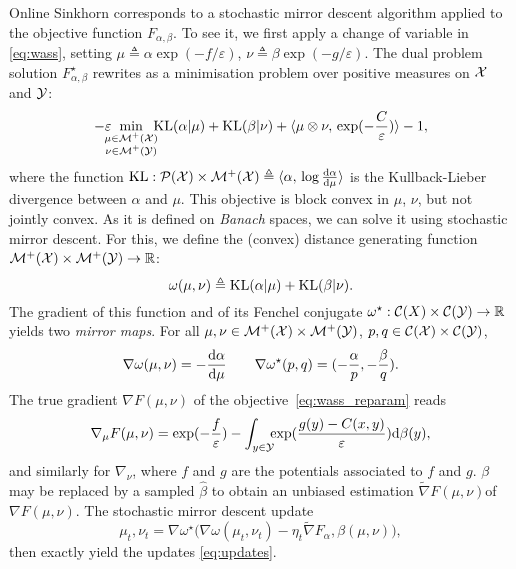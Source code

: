 Online Sinkhorn corresponds to a stochastic mirror descent algorithm applied to
the objective function $F_{\alpha, \beta}$. To see it, we first apply a change
of variable in \eqref{eq:wass}, setting $\mu \triangleq \alpha \exp(-f /
\varepsilon)$, $\nu \triangleq \beta \exp(-g / \varepsilon)$. The dual problem solution 
$F_{\alpha, \beta}^\star$
rewrites as a minimisation problem over positive measures on $\mathcal{X}$ and $\mathcal{Y}$:
\begin{equation}\label{eq:wass_reparam}
    - \varepsilon \!\!\!\!\min_{\substack{\mu \in \mathcal{M}^+(\mathcal{X}) \\ 
    \nu \in \mathcal{M}^+(\mathcal{Y})}} \!\!\!\textrm{KL}(\alpha | \mu)
    + \textrm{KL}(\beta | \nu) + \langle \mu \otimes \nu,\,\exp(-\frac{C}{\varepsilon})\rangle - 1,
\end{equation}
where the function $\textrm{KL}: \mathcal{P}(\mathcal{X}) \times \mathcal{M}^+(\mathcal{X}) \triangleq \langle \alpha,\,
    \log \frac{\textrm{d} \alpha}{\textrm{d} \mu}\rangle$ is the Kullback-Lieber divergence between
$\alpha$ and $\mu$. This objective is block convex in $\mu$, $\nu$, but not jointly convex. As it is defined on \textit{Banach} spaces, we can solve it using stochastic mirror descent. For this, we define the (convex) distance generating function $\mathcal{M}^+(\mathcal{X}) \times \mathcal{M}^+(\mathcal{Y}) \to \mathbb{R}$:
\begin{equation}
    \omega(\mu, \nu) \triangleq \textrm{KL}(\alpha | \mu) + \textrm{KL}(\beta | \nu).
\end{equation}
The gradient of this function and of its Fenchel conjugate $\omega^\star: \mathcal{C}(X)
\times \mathcal{C}(\mathcal{Y}) \to \mathbb{R}$ yields two \textit{mirror maps}. For all $\mu, \nu \in
\mathcal{M}^+(\mathcal{X}) \times \mathcal{M}^+(\mathcal{Y})$, $p, q \in \mathcal{C}(\mathcal{X}) \times \mathcal{C}(\mathcal{Y})$,
\begin{equation}
    \nabla \omega(\mu, \nu) = - \frac{\textrm{d} \alpha}{\textrm{d} \mu}
    \qquad \nabla \omega^\star(p, q) = (-\frac{\alpha}{p}, -\frac{\beta}{q}).
\end{equation}
The true gradient $\nabla F(\mu, \nu)$ of the objective~\eqref{eq:wass_reparam} reads
\begin{equation}
    \nabla_\mu F(\mu, \nu) = \exp(-\frac{f}{\varepsilon}) - 
    \int_{y \in \mathcal{Y}} \!\!\! \exp(\frac{g(y) - C(x, y)}{\varepsilon})\textrm{d} \beta(y),
\end{equation}
and similarly for $\nabla_\nu$, where $f$ and $g$ are the potentials associated
to $f$ and $g$. $\beta$ may be replaced by a sampled $\hat \beta$ to obtain an
unbiased estimation $\tilde \nabla F(\mu, \nu)$of $\nabla F(\mu, \nu)$. The
stochastic mirror descent update
% 
\begin{equation}
    \mu_t, \nu_t = \nabla \omega^\star\Big( \nabla \omega(\mu_t, \nu_t) - 
    \eta_t \tilde \nabla F_\alpha, \beta(\mu, \nu)\Big),
\end{equation}
then exactly yield the updates \eqref{eq:updates}. 


